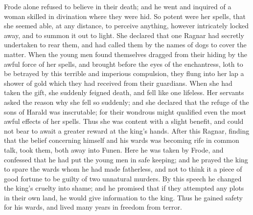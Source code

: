 \documentclass[10pt,a4paper]{report}
\begin{document}
Frode alone refused to believe in their death; and he went and inquired of a woman skilled in divination where they were hid. So potent were her spells, that she seemed able, at any distance, to perceive anything, however intricately locked away, and to summon it out to light. She declared that one Ragnar had secretly undertaken to rear them, and had called them by the names of dogs to cover the matter. When the young men found themselves dragged from their hiding by the awful force of her spells, and brought before the eyes of the enchantress, loth to be betrayed by this terrible and imperious compulsion, they flung into her lap a shower of gold which they had received from their guardians. When she had taken the gift, she suddenly feigned death, and fell like one lifeless. Her servants asked the reason why she fell so suddenly; and she declared that the refuge of the sons of Harald was inscrutable; for their wondrous might qualified even the most awful effects of her spells. Thus she was content with a slight benefit, and could not bear to await a greater reward at the king's hands. After this Ragnar, finding that the belief concerning himself and his wards was becoming rife in common talk, took them, both away into Funen. Here he was taken by Frode, and confessed that he had put the young men in safe keeping; and he prayed the king to spare the wards whom he had made fatherless, and not to think it a piece of good fortune to be guilty of two unnatural murders. By this speech he changed the king's cruelty into shame; and he promised that if they attempted any plots in their own land, he would give information to the king. Thus he gained safety for his wards, and lived many years in freedom from terror.\\
\end{document}
